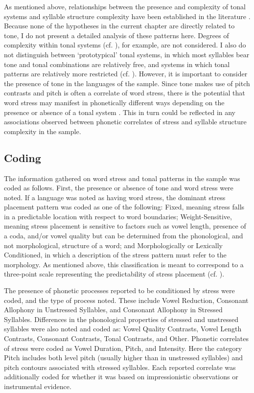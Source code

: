   As mentioned above, relationships between the presence and complexity of tonal systems and syllable structure complexity have been established in the literature \citep{Maddieson2013d}. Because none of the hypotheses in the current chapter are directly related to tone, I do not present a detailed analysis of these patterns here. Degrees of complexity within tonal systems (cf. \citealt{Maddieson2013d}), for example, are not considered. I also do not distinguish between ‘prototypical’ tonal systems, in which most syllables bear tone and tonal combinations are relatively free, and systems in which tonal patterns are relatively more restricted (cf. \citealt{Hyman2009}). However, it is important to consider the presence of tone in the languages of the sample. Since tone makes use of pitch contrasts and pitch is often a correlate of word stress, there is the potential that word stress may manifest in phonetically different ways depending on the presence or absence of a tonal system \citep{Gordon2011}. This in turn could be reflected in any associations observed between phonetic correlates of stress and syllable structure complexity in the sample. 

\subsection{Coding}\label{sec:5.2.2}

  The information gathered on word stress and tonal patterns in the sample was coded as follows. First, the presence or absence of tone and word stress were noted. If a language was noted as having word stress, the dominant stress placement pattern was coded as one of the following: Fixed, meaning stress falls in a predictable location with respect to word boundaries; Weight-Sensitive, meaning stress placement is sensitive to factors such as vowel length, presence of a coda, and/or vowel quality but can be determined from the phonological, and not morphological, structure of a word; and Morphologically or Lexically Conditioned, in which a description of the stress pattern must refer to the morphology. As mentioned above, this classification is meant to correspond to a three-point scale representing the predictability of stress placement (cf. \citealt{Schiering2007}). 

  The presence of phonetic processes reported to be conditioned by stress were coded, and the type of process noted. These include Vowel Reduction, Consonant Allophony in Unstressed Syllables, and Consonant Allophony in Stressed Syllables. Differences in the phonological properties of stressed and unstressed syllables were also noted and coded as: Vowel Quality Contrasts, Vowel Length Contrasts, Consonant Contrasts, Tonal Contrasts, and Other. Phonetic correlates of stress were coded as Vowel Duration, Pitch, and Intensity. Here the category Pitch includes both level pitch (usually higher than in unstressed syllables) and pitch contours associated with stressed syllables. Each reported correlate was additionally coded for whether it was based on impressionistic observations or instrumental evidence.

